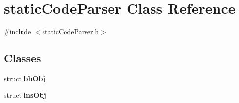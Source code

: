\hypertarget{classstaticCodeParser}{
\section{staticCodeParser Class Reference}
\label{classstaticCodeParser}
}


{\ttfamily \#include $<$staticCodeParser.h$>$}

\subsection*{Classes}
\begin{DoxyCompactItemize}
\item 
struct {\bfseries bbObj}
\item 
struct {\bfseries insObj}
\end{DoxyCompactItemize}
